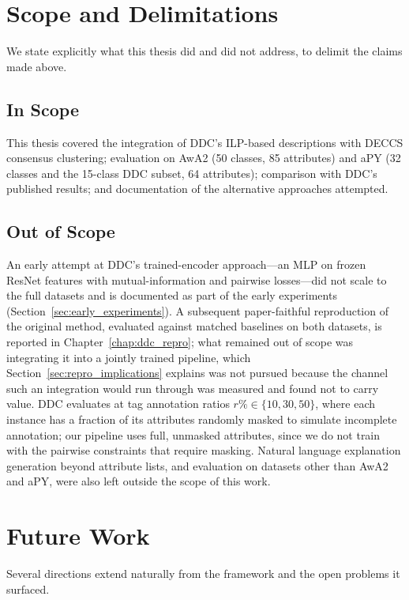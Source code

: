 \section{Scope and Delimitations}

We state explicitly what this thesis did and did not address, to delimit the claims made above.

\subsection{In Scope}

This thesis covered the integration of DDC's ILP-based descriptions with DECCS consensus clustering; evaluation on AwA2 (50 classes, 85 attributes) and aPY (32 classes and the 15-class DDC subset, 64 attributes); comparison with DDC's published results; and documentation of the alternative approaches attempted.

\subsection{Out of Scope}

An early attempt at DDC's trained-encoder approach---an MLP on frozen ResNet features with mutual-information and pairwise losses---did not scale to the full datasets and is documented as part of the early experiments (Section~\ref{sec:early_experiments}). A subsequent paper-faithful reproduction of the original method, evaluated against matched baselines on both datasets, is reported in Chapter~\ref{chap:ddc_repro}; what remained out of scope was integrating it into a jointly trained pipeline, which Section~\ref{sec:repro_implications} explains was not pursued because the channel such an integration would run through was measured and found not to carry value. DDC evaluates at tag annotation ratios $r\% \in \{10, 30, 50\}$, where each instance has a fraction of its attributes randomly masked to simulate incomplete annotation; our pipeline uses full, unmasked attributes, since we do not train with the pairwise constraints that require masking. Natural language explanation generation beyond attribute lists, and evaluation on datasets other than AwA2 and aPY, were also left outside the scope of this work.

\section{Future Work}

Several directions extend naturally from the framework and the open problems it surfaced.

